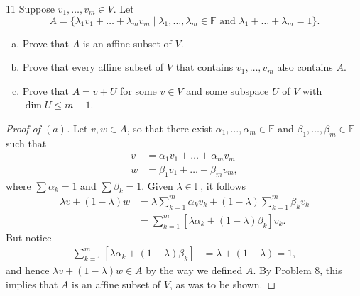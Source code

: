 \documentclass{extarticle}
\newenvironment{problem}[1]{\begin{prob*}{#1}{}}{\end{prob*}}
\newcommand{\F}{\mathbb{F}}
\begin{document}
\begin{problem}{11}
Suppose $v_1,\dots, v_m\in V$.  Let
\begin{equation*}
A = \{\lambda_1 v_1 + \dots + \lambda_m v_m\mid \lambda_1,\dots,\lambda_m\in\F\text{ and }\lambda_1 + \dots + \lambda_m = 1\}.
\end{equation*}
\begin{enumerate}[(a)]
\item Prove that $A$ is an affine subset of $V$.
\item Prove that every affine subset of $V$ that contains $v_1,\dots, v_m$ also contains $A$.
\item Prove that $A = v + U$ for some $v\in V$ and some subspace $U$ of $V$ with $\dim U\leq m - 1$.
\end{enumerate}
\end{problem}
\begin{proof}[Proof of $(a)$]
Let $v,w\in A$, so that there exist $\alpha_1,\dots, \alpha_m\in\F$ and $\beta_1,\dots, \beta_m\in\F$ such that
\begin{align*}
v &= \alpha_1v_1 + \dots + \alpha_mv_m\\
w &= \beta_1v_1 + \dots + \beta_mv_m,
\end{align*}
where $\sum \alpha_k = 1$ and $\sum\beta_k = 1$.  Given $\lambda\in\F$, it follows
\begin{align*}
\lambda v + (1 - \lambda)w &= \lambda\sum_{k = 1}^m \alpha_kv_k + (1 - \lambda)\sum_{k = 1}^m\beta_kv_k\\
&= \sum_{k = 1}^m\left[\lambda \alpha_k + (1 - \lambda)\beta_k\right]v_k.
\end{align*}
But notice
\begin{align*}
\sum_{k = 1}^m\left[\lambda \alpha_k + (1 - \lambda)\beta_k\right] &= \lambda + (1 - \lambda) = 1,
\end{align*}
and hence $\lambda v + (1 - \lambda)w \in A$ by the way we defined $A$.  By Problem 8, this implies that $A$ is an affine subset of $V$, as was to be shown.
\end{proof}
\end{document}
